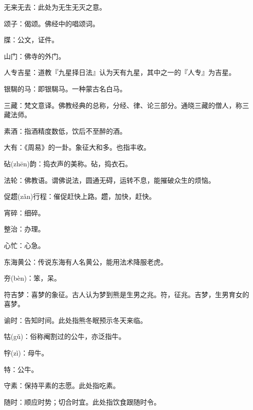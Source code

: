 \startbuffer[520]
无来无去：此处为无生无灭之意。
\stopbuffer


\startbuffer[521]
颂子：偈颂。佛经中的唱颂词。
\stopbuffer


\startbuffer[522]
牒：公文，证件。
\stopbuffer


\startbuffer[523]
山门：佛寺的外门。
\stopbuffer


\startbuffer[524]
人专吉星：道教『九星择日法』认为天有九星，其中之一的『人专』为吉星。
\stopbuffer


\startbuffer[525]
银騔的马：即银騔马。一种蒙古名白马。
\stopbuffer


\startbuffer[526]
三藏：梵文意译。佛教经典的总称，分经、律、论三部分。通晓三藏的僧人，称三藏法师。
\stopbuffer


\startbuffer[527]
素酒：指酒精度数低，饮后不至醉的酒。
\stopbuffer


\startbuffer[528]
大有：《周易》的一卦。象征大和多。也指丰收。
\stopbuffer


\startbuffer[529]
砧(zhēn)韵：捣衣声的美称。砧，捣衣石。
\stopbuffer


\startbuffer[530]
法轮：佛教语。谓佛说法，圆通无碍，运转不息，能摧破众生的烦恼。
\stopbuffer


\startbuffer[531]
促趱(zǎn)行程：催促赶快上路。趱，加快，赶快。
\stopbuffer


\startbuffer[532]
宵碎：细碎。
\stopbuffer


\startbuffer[533]
整治：办理。
\stopbuffer


\startbuffer[534]
心忙：心急。
\stopbuffer


\startbuffer[535]
东海黄公：传说东海有人名黄公，能用法术降服老虎。
\stopbuffer


\startbuffer[536]
夯(bèn)：笨，呆。
\stopbuffer


\startbuffer[537]
符吉梦：喜梦的象征。古人认为梦到熊是生男之兆。符，征兆。吉梦，生男育女的喜梦。
\stopbuffer


\startbuffer[538]
谕时：告知时间。此处指熊冬眠预示冬天来临。
\stopbuffer


\startbuffer[539]
牯(gǔ)：俗称阉割过的公牛，亦泛指牛。
\stopbuffer


\startbuffer[540]
牸(zì)：母牛。
\stopbuffer


\startbuffer[541]
特：公牛。
\stopbuffer


\startbuffer[542]
守素：保持平素的志愿。此处指吃素。
\stopbuffer


\startbuffer[543]
随时：顺应时势；切合时宜。此处指饮食跟随时令。
\stopbuffer


